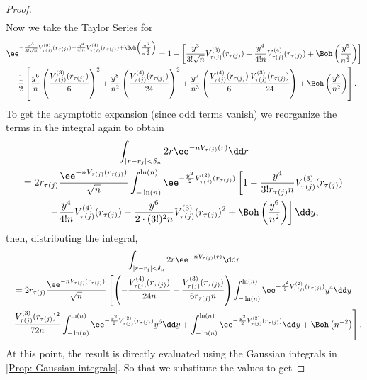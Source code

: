 \begin{proof}
\begin{align}
	\end{align}
	Now we take the Taylor Series for 
	\begin{multline}
		\ee^{- \frac{y^3}{3! \sqrt{n}} V^{(3)}_{\tau(j)}(r_{\tau(j)}) - \frac{y^4}{4! n} V^{(4)}_{\tau(j)}(r_{\tau(j)}) + \Boh\left(\frac{y^5}{n^\frac{3}{2}}\right)} = 1 - \left[ \frac{y^3}{3! \sqrt{n}} V^{(3)}_{\tau(j)}(r_{\tau(j)}) + \frac{y^4}{4! n} V^{(4)}_{\tau(j)}(r_{\tau(j)}) + \Boh\left(\frac{y^5}{n^\frac{3}{2}}\right) \right] \\ 
		- \frac{1}{2} \left[ \frac{y^6}{n} \left(\frac{V^{(3)}_{\tau(j)}(r_{\tau(j)})}{6} \right)^2 + \frac{y^8}{n^2} \left(\frac{V^{(4)}_{\tau(j)}(r_{\tau(j)})}{24} \right)^2 + \frac{y^7}{n^3} \left(\frac{V^{(4)}_{\tau(j)}(r_{\tau(j)})}{6} \frac{V^{(3)}_{\tau(j)}(r_{\tau(j)})}{24} \right) + \Boh\left(\frac{y^8}{n^2}\right)  \right].
	\end{multline}
	To get the asymptotic expansion (since odd terms vanish) we reorganize the terms in the integral again to obtain
	\begin{multline}
		\int_{|r - r_j| < \delta_n} 2r \ee^{-n V_{\tau(j)}(r)} \dd r\\ = 2 r_{\tau(j)} \frac{\ee^{-n V_{\tau(j)}(r_{\tau(j)})}}{\sqrt{n}}  \int_{-\ln(n)}^{\ln(n)} \ee^{-\frac{y^2}{2} V^{(2)}_{\tau(j)}(r_{\tau(j)})} \left[ 1 - \frac{y^4}{3! r_{\tau(j)} n} V^{(3)}_{\tau(j)}(r_{\tau(j)}) \right. \\
		\left. - \frac{y^4}{4! n} V^{(4)}_{\tau(j)}(r_{\tau(j)}) - \frac{y^6}{2 \cdot (3!)^2 n} V^{(3)}_{\tau(j)}(r_{\tau(j)})^2 + \Boh\left(\frac{y^6}{n^2}\right) \right] \dd y,
		\label{Equation: value-contributing integral}
	\end{multline}
	then, distributing the integral,
	\begin{multline}
		\int_{|r - r_j| < \delta_n} 2r \ee^{-n V_{\tau(j)}(r)} \dd r\\ 
		 = 2 r_{\tau(j)} \frac{\ee^{-n V_{\tau(j)}(r_{\tau(j)})}}{\sqrt{n}}
		 \left[
		\left(- \frac{V^{(4)}_{\tau(j)}(r_{\tau(j)})}{24 n} - \frac{V^{(3)}_{\tau(j)}(r_{\tau(j)})}{6 r_{\tau(j)} n} \right)
		\int_{-\ln(n)}^{\ln(n)} \ee^{-\frac{y^2}{2} V^{(2)}_{\tau(j)}(r_{\tau(j)})} y^4 \dd y \right. \\
		\left. - \frac{V^{(3)}_{\tau(j)}(r_{\tau(j)})^2}{72 n}
		\int_{-\ln(n)}^{\ln(n)} \ee^{-\frac{y^2}{2} V^{(2)}_{\tau(j)}(r_{\tau(j)})} y^6 \dd y +
		\int_{-\ln(n)}^{\ln(n)} \ee^{-\frac{y^2}{2} V^{(2)}_{\tau(j)}(r_{\tau(j)})} \dd y + \Boh\left( n^{-2} \right) \right].
	\end{multline}
	At this point, the result is directly evaluated using the Gaussian integrals in \autoref{Prop: Gaussian integrals}.	So that we substitute the values to get

\end{proof}
